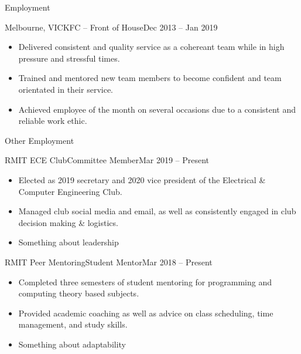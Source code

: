 \documentclass[]{mcdowellcv}
\begin{document}
	\begin{cvsection}{Employment}
		\begin{cvsubsection}{Melbourne, VIC}{KFC -- Front of House}{Dec 2013 -- Jan 2019}
			\begin{itemize}
				\item Delivered consistent and quality service as a cohereant team while in high pressure and stressful times.
				\item Trained and mentored new team members to become confident and team orientated in their service.
				\item Achieved employee of the month on several occasions due to a consistent and reliable work ethic.
			\end{itemize}
		\end{cvsubsection}
	\end{cvsection}

	\begin{cvsection}{Other Employment}
		\begin{cvsubsection}{RMIT ECE Club}{Committee Member}{Mar 2019 -- Present}
			\begin{itemize}
				\item Elected as 2019 secretary and 2020 vice president of the Electrical \& Computer Engineering Club.
				\item Managed club social media and email, as well as consistently engaged in club decision making \& logistics.
				\item Something about leadership
			\end{itemize}
		\end{cvsubsection}

		\begin{cvsubsection}{RMIT Peer Mentoring}{Student Mentor}{Mar 2018 -- Present}
			\begin{itemize}
				\item Completed three semesters of student mentoring for programming and computing theory based subjects.
				\item Provided academic coaching as well as advice on class scheduling, time management, and study skills.
				\item Something about adaptability
			\end{itemize}
		\end{cvsubsection}
	\end{cvsection}
\end{document}
